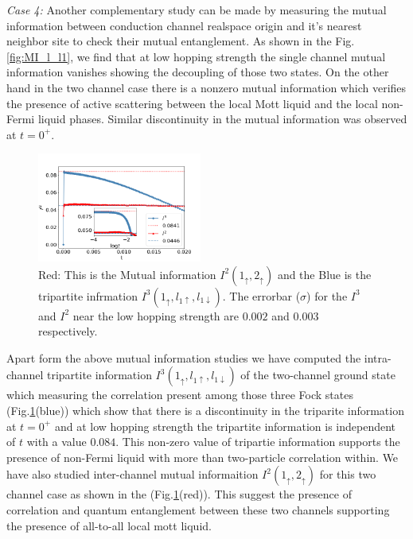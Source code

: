 \documentclass[reprint,prb,superscriptaddress]{revtex4-2}
\begin{document}
\par \textit{Case 4:} Another complementary study can be made by measuring the mutual information between conduction channel realspace origin and it's nearest neighbor site to check their mutual entanglement. As shown in the Fig.\ref{fig:MI_l_l1}, we find that at low hopping strength the single channel mutual information vanishes showing the decoupling of those two states. On the other hand in the two channel case there is a nonzero mutual information which verifies the presence of active scattering between the local Mott liquid and the local non-Fermi liquid phases. Similar discontinuity in the mutual information was observed at $t=0^+$.
\begin{figure}[!htpb]
\centering
\includegraphics[width=0.48\textwidth]{plt/I3_I2_A_I.png}
\caption{Red: This is the Mutual information $I^2(1_{\uparrow},2_{\uparrow})$ and the Blue is the tripartite infrmation $I^3(1_{\uparrow},l_{1\uparrow},l_{1\downarrow})$. The errorbar ($\sigma$) for the $I^3$ and $I^2$ near the low hopping strength are $0.002$ and $0.003$ respectively.}
\label{fig:I3_I2_two_channel}
\end{figure}
Apart form the above mutual information studies we have computed the intra-channel tripartite information $I^3(1_{\uparrow},l_{1\uparrow},l_{1\downarrow})$ of the two-channel ground state which measuring the correlation present among those three Fock states (Fig.\ref{fig:I3_I2_two_channel}(blue)) which show that there is a discontinuity in the triparite information at $t=0^+$ and at low hopping strength the tripartite information is independent of $t$ with a value $0.084$. This non-zero value of tripartie information supports the presence of non-Fermi liquid with more than two-particle correlation within. We have also studied inter-channel mutual informaition $I^2(1_{\uparrow},2_{\uparrow})$ for this two channel case as shown in the (Fig.\ref{fig:I3_I2_two_channel}(red)). This suggest the presence of correlation and quantum entanglement between these two channels supporting the presence of all-to-all local mott liquid.
\end{document}
